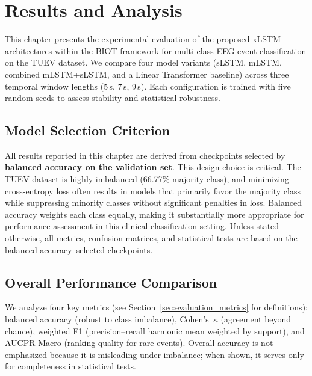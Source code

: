 \cleardoubleoddpage
\chapter{Results and Analysis}
\label{sec:results}

This chapter presents the experimental evaluation of the proposed \ac{xLSTM}
architectures within the \ac{BIOT} framework for multi-class EEG event
classification on the \ac{TUEV} dataset. We compare four model variants
(\ac{sLSTM}, \ac{mLSTM}, combined \ac{mLSTM}+\ac{sLSTM}, and a Linear
Transformer baseline) across three temporal window lengths (5\,s, 7\,s, 9\,s).
Each configuration is trained with five random seeds to assess stability and
statistical robustness.

\section{Model Selection Criterion}
\label{sec:model_selection_criterion}

All results reported in this chapter are derived from checkpoints selected by
\textbf{balanced accuracy on the validation set}. This design choice is
critical. The TUEV dataset is highly imbalanced (66.77\% majority class), and
minimizing cross-entropy loss often results in models that primarily favor the
majority class while suppressing minority classes without significant penalties
in loss. Balanced accuracy weights each class equally, making it substantially
more appropriate for performance assessment in this clinical classification
setting. Unless stated otherwise, all metrics, confusion matrices, and
statistical tests are based on the balanced-accuracy–selected checkpoints.

\section{Overall Performance Comparison}
\label{sec:overall_performance}

We analyze four key metrics (see Section~\ref{sec:evaluation_metrics} for
definitions): balanced accuracy (robust to class imbalance), Cohen's~\(\kappa\)
(agreement beyond chance), weighted F1 (precision--recall harmonic mean weighted
by support), and AUCPR Macro (ranking quality for rare events). Overall
accuracy is not emphasized because it is misleading under imbalance; when shown,
it serves only for completeness in statistical tests.

